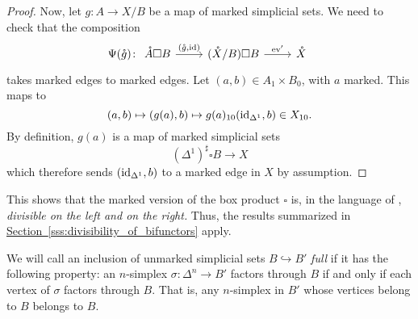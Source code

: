 \documentclass[main.tex]{subfiles}
\begin{document}
\begin{proof}
  Now, let $g\colon A \to X / B$ be a map of marked simplicial sets. We need to check that the composition
  \begin{equation*}
    \Psi(\mathring{g})\colon
    \begin{tikzcd}
      \mathring{A} \square B
      \arrow[r, "{(\mathring{g}, \id)}"]
      & (\mathring{X} / B) \square B
      \arrow[r, "\ev'"]
      & \mathring{X}
    \end{tikzcd}
  \end{equation*}
  takes marked edges to marked edges. Let $(a, b) \in A_{1} \times B_{0}$, with $a$ marked. This maps to
  \begin{equation*}
    (a, b) \mapsto (g(a), b) \mapsto g(a)_{10}(\mathrm{id}_{\Delta^{1}}, b) \in X_{10}.
  \end{equation*}
  By definition, $g(a)$ is a map of marked simplicial sets
  \begin{equation*}
    (\Delta^{1})^{\sharp} \square B \to X
  \end{equation*}
  which therefore sends $(\mathrm{id}_{\Delta^{1}}, b)$ to a marked edge in $X$ by assumption.
\end{proof}

This shows that the marked version of the box product $\square$ is, in the language of \cite{qcats_vs_segal_spaces}, \emph{divisible on the left and on the right.} Thus, the results summarized in \hyperref[sss:divisibility_of_bifunctors]{Section~\ref*{sss:divisibility_of_bifunctors}} apply.

We will call an inclusion of unmarked simplicial sets $B \hookrightarrow B'$ \emph{full} if it has the following property: an $n$-simplex $\sigma\colon \Delta^{n} \to B'$ factors through $B$ if and only if each vertex of $\sigma$ factors through $B$. That is, any $n$-simplex in $B'$ whose vertices belong to $B$ belongs to $B$.
\end{document}
